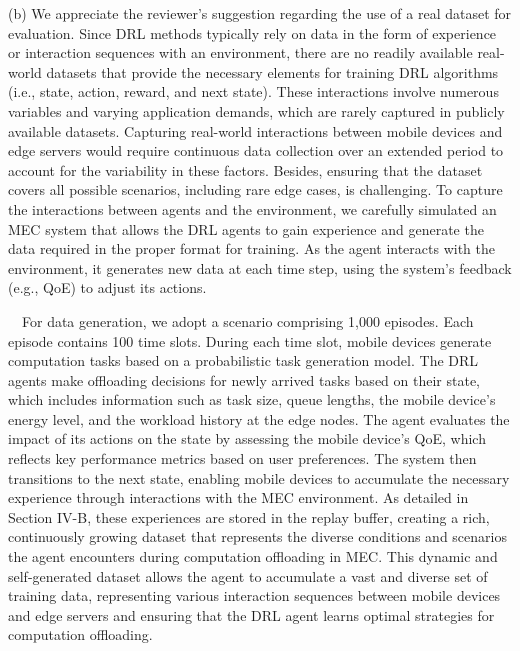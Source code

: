 \documentclass[12pt,draftclsnofoot,onecolumn]{IEEEtran}
\begin{document}
\begin{enumerate}
(b) We appreciate the reviewer’s suggestion regarding the use of a real dataset for evaluation. Since DRL methods typically rely on data in the form of experience or interaction sequences with an environment, there are no readily available real-world datasets that provide the necessary elements for training DRL algorithms (i.e., state, action, reward, and next state). These interactions involve numerous variables and varying application demands, which are rarely captured in publicly available datasets. Capturing real-world interactions between mobile devices and edge servers would require continuous data collection over an extended period to account for the variability in these factors. Besides, ensuring that the dataset covers all possible scenarios, including rare edge cases, is challenging. To capture the interactions between agents and the environment, we carefully simulated an MEC system that allows the DRL agents to gain experience and generate the data required in the proper format for training. As the agent interacts with the environment, it generates new data at each time step, using the system’s feedback (e.g., QoE) to adjust its actions. \vspace{3mm}






\,\,\,\, For data generation, we adopt a scenario comprising 1,000 episodes. Each episode contains 100 time slots. During each time slot, mobile devices generate computation tasks based on a probabilistic task generation model. The DRL agents make offloading decisions for newly arrived tasks based on their state, which includes information such as task size, queue lengths, the mobile device’s energy level, and the workload history at the edge nodes. The agent evaluates the impact of its actions on the state by assessing the mobile device's QoE, which reflects key performance metrics based on user preferences. The system then transitions to the next state, enabling mobile devices to accumulate the necessary experience through interactions with the MEC environment. As detailed in Section IV-B, these experiences are stored in the replay buffer, creating a rich, continuously growing dataset that represents the diverse conditions and scenarios the agent encounters during computation offloading in MEC. This dynamic and self-generated dataset allows the agent to accumulate a vast and diverse set of training data, representing various interaction sequences between mobile devices and edge servers and ensuring that the DRL agent learns optimal strategies for computation offloading.\vspace{2mm}



\end{enumerate}
\end{document}
